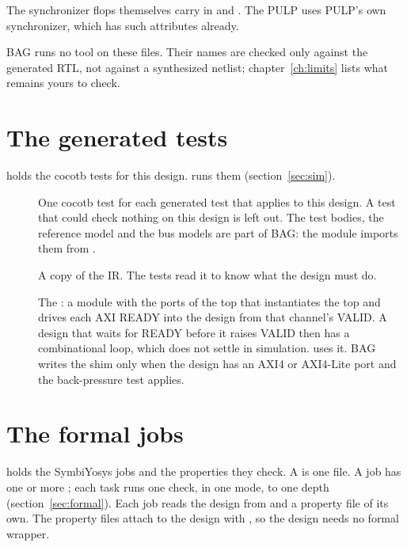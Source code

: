 The synchronizer flops themselves carry 
in  and . The PULP  uses PULP's own
synchronizer, which has such attributes already.

BAG runs no tool on these files. Their names are checked only against the generated RTL,
not against a synthesized netlist; chapter~\ref{ch:limits} lists what remains yours to
check.

\section{The generated tests}
\label{sec:tests}

 holds the cocotb tests for this design.  runs them
(section~\ref{sec:sim}).

\begin{description}
\item[] One cocotb test for each generated test that
  applies to this design. A test that could check nothing on this design is left out.
  The test bodies, the reference model and the bus models are part of BAG: the module
  imports them from .
\item[] A copy of the IR. The tests read it to know what
  the design must do.
\item[] The : a module with the ports of
  the top that instantiates the top and drives each AXI READY into the design from that
  channel's VALID. A design that waits for READY before it raises VALID then has a
  combinational loop, which does not settle in simulation. 
   uses it. BAG writes the shim only when the design has an AXI4 or
  AXI4-Lite port and the back-pressure test applies.
\end{description}



\section{The formal jobs}
\label{sec:jobs}

 holds the SymbiYosys jobs and the properties they check. A  is
one  file. A job has one or more ; each task runs one check, in
one mode, to one depth (section~\ref{sec:formal}). Each job reads the design from
 and a property file of its own. The property files attach to the design with
, so the design needs no formal wrapper.

